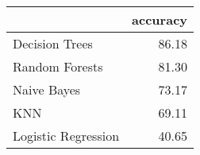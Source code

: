 \begin{tabular}{lr}
\toprule
{} &  accuracy \\
\midrule
Decision Trees      &     86.18 \\
Random Forests      &     81.30 \\
Naive Bayes         &     73.17 \\
KNN                 &     69.11 \\
Logistic Regression &     40.65 \\
\bottomrule
\end{tabular}

